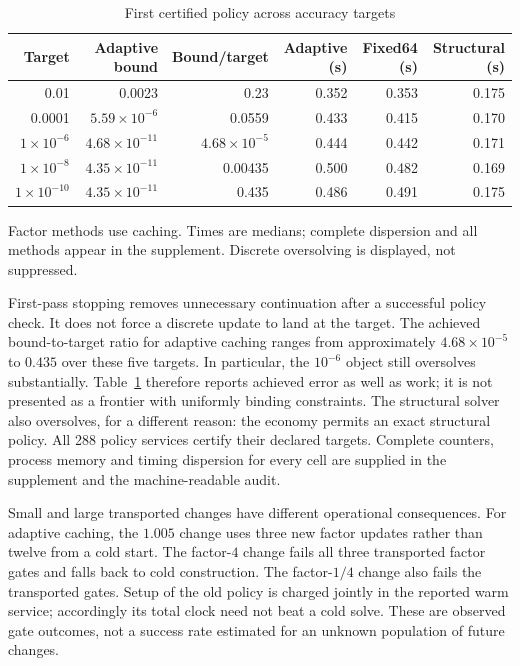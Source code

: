 \documentclass[ecta,nameyear,draft]{econsocart}
\theoremstyle{definition}
\theoremstyle{remark}
\begin{document}
\begin{table}[htbp]
\centering\small\setlength{\tabcolsep}{5pt}
\caption{First certified policy across accuracy targets}\label{tab:r39accuracy}
\begin{tabular}{rrrrrr}
\toprule
Target & Adaptive bound & Bound/target & Adaptive (s) & Fixed64 (s) & Structural (s)\\
\midrule
0.01 & 0.0023 & 0.23 & 0.352 & 0.353 & 0.175\\
0.0001 & $5.59\times10^{-6}$ & 0.0559 & 0.433 & 0.415 & 0.170\\
$1\times10^{-6}$ & $4.68\times10^{-11}$ & $4.68\times10^{-5}$ & 0.444 & 0.442 & 0.171\\
$1\times10^{-8}$ & $4.35\times10^{-11}$ & 0.00435 & 0.500 & 0.482 & 0.169\\
$1\times10^{-10}$ & $4.35\times10^{-11}$ & 0.435 & 0.486 & 0.491 & 0.175\\
\bottomrule
\end{tabular}
\par\smallskip\begin{minipage}{.96\linewidth}\footnotesize Factor methods use caching. Times are medians; complete dispersion and all methods appear in the supplement. Discrete oversolving is displayed, not suppressed.\end{minipage}
\end{table}



First-pass stopping removes unnecessary continuation after a successful policy
check. It does not force a discrete update to land at the target. The achieved
bound-to-target ratio for adaptive caching ranges from approximately
$4.68\times10^{-5}$ to $0.435$ over these five targets. In particular, the
$10^{-6}$ object still oversolves substantially. Table~\ref{tab:r39accuracy}
therefore reports achieved error as well as work; it is not presented as a
frontier with uniformly binding constraints. The structural solver also
oversolves, for a different reason: the economy permits an exact structural
policy. All 288 policy services certify their declared targets. Complete
counters, process memory and timing dispersion for every cell are supplied in
the supplement and the machine-readable audit.

Small and large transported changes have different operational consequences.
For adaptive caching, the $1.005$ change uses three new factor updates rather
than twelve from a cold start. The factor-$4$ change fails all three transported
factor gates and falls back to cold construction. The factor-$1/4$ change also
fails the transported gates. Setup of the old policy is charged jointly in the
reported warm service; accordingly its total clock need not beat a cold solve.
These are observed gate outcomes, not a success rate estimated for an unknown
population of future changes.
\end{document}
